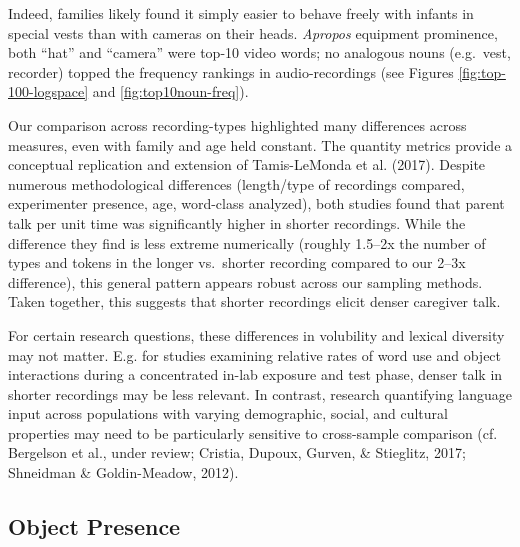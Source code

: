 \documentclass[man]{apa6}
\theoremstyle{definition}
\theoremstyle{definition}
\theoremstyle{definition}
\theoremstyle{remark}
\begin{document}
Indeed, families likely found it simply easier to behave freely with
infants in special vests than with cameras on their heads.
\emph{Apropos} equipment prominence, both \enquote{hat} and
\enquote{camera} were top-10 video words; no analogous nouns (e.g.~vest,
recorder) topped the frequency rankings in audio-recordings (see Figures
\ref{fig:top-100-logspace} and \ref{fig:top10noun-freq}).

Our comparison across recording-types highlighted many differences
across measures, even with family and age held constant. The quantity
metrics provide a conceptual replication and extension of Tamis-LeMonda
et al. (2017). Despite numerous methodological differences (length/type
of recordings compared, experimenter presence, age, word-class
analyzed), both studies found that parent talk per unit time was
significantly higher in shorter recordings. While the difference they
find is less extreme numerically (roughly 1.5--2x the number of types
and tokens in the longer vs.~shorter recording compared to our 2--3x
difference), this general pattern appears robust across our sampling
methods. Taken together, this suggests that shorter recordings elicit
denser caregiver talk.

For certain research questions, these differences in volubility and
lexical diversity may not matter. E.g. for studies examining relative
rates of word use and object interactions during a concentrated in-lab
exposure and test phase, denser talk in shorter recordings may be less
relevant. In contrast, research quantifying language input across
populations with varying demographic, social, and cultural properties
may need to be particularly sensitive to cross-sample comparison (cf.
Bergelson et al., under review; Cristia, Dupoux, Gurven, \& Stieglitz,
2017; Shneidman \& Goldin-Meadow, 2012).

\subsection{Object Presence}\label{object-presence}
\end{document}
